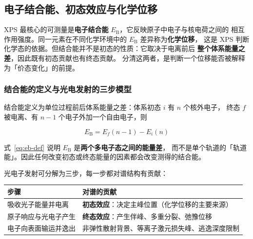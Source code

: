 
\subsection{电子结合能、初态效应与化学位移}

\begin{probout}
XPS 最核心的可测量是\textbf{电子结合能} $E_{\mathrm{B}}$，它反映原子中电子与核电荷之间的
相互作用强度。同一元素在不同化学环境中的 $E_{\mathrm{B}}$ 差异称为\textbf{化学位移}，
这是 XPS 判断化学态的依据。但结合能并不是初态的性质：它取决于电离前后
\textbf{整个体系能量之差}，因此既有初态贡献也有终态贡献。
分清这两者，是判断一个位移能否被解释为「价态变化」的前提。
\end{probout}

\subsubsection{结合能的定义与光电发射的三步模型}

结合能定义为单位过程前后体系能量之差：体系初态 $i$ 有 $n$ 个核外电子，
终态 $f$ 被电离、有 $n-1$ 个电子外加一个自由电子，则

\begin{equation}\label{eq:eb-def}
E_{\mathrm{B}}=E_f(n-1)-E_i(n)
\end{equation}

式~\eqref{eq:eb-def} 说明 $E_{\mathrm{B}}$ 是\textbf{两个多电子态之间的能量差}，
而不是单个轨道的「轨道能」。因此任何改变初态或终态能量的因素都会改变测得的结合能。

光电子发射可分解为三步，每一步都对谱结构有贡献：

\begin{center}
{\srcsize
\begin{tabularx}{\columnwidth}{@{}lX@{}}
\toprule
步骤 & 对谱的贡献 \\
\midrule
吸收光子能量并电离 & \textbf{初态效应}：决定主峰位置（化学位移的主要来源） \\
原子响应与光电子产生 & \textbf{终态效应}：产生伴峰、多重分裂、弛豫位移 \\
电子向表面输运并逸出 & 非弹性散射背景、等离子激元损失峰、逃逸深度限制 \\
\bottomrule
\end{tabularx}}
\end{center}

